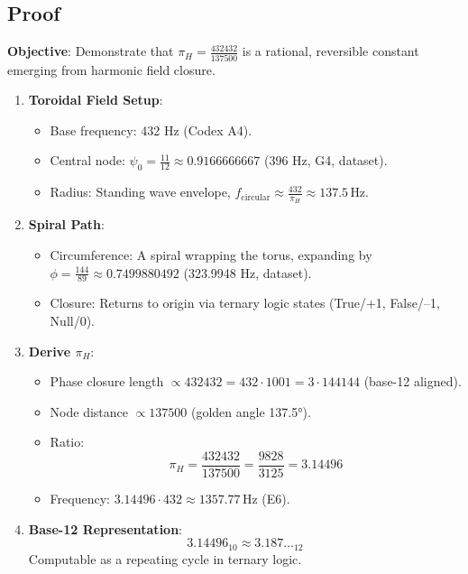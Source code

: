 \documentclass[a4paper,12pt]{article}
\begin{document}
\subsection{Proof}
\textbf{Objective}: Demonstrate that \(\pi_H = \frac{432432}{137500}\) is a rational, reversible constant emerging from harmonic field closure.

\begin{enumerate}
    \item \textbf{Toroidal Field Setup}:
    \begin{itemize}
        \item Base frequency: 432 Hz (Codex A4).
        \item Central node: \(\psi_0 = \frac{11}{12} \approx 0.9166666667\) (396 Hz, G4, dataset).
        \item Radius: Standing wave envelope, \( f_{\text{circular}} \approx \frac{432}{\pi_H} \approx 137.5 \, \text{Hz} \).
    \end{itemize}
    
    \item \textbf{Spiral Path}:
    \begin{itemize}
        \item Circumference: A spiral wrapping the torus, expanding by \(\phi = \frac{144}{89} \approx 0.7499880492\) (323.9948 Hz, dataset).
        \item Closure: Returns to origin via ternary logic states (True/+1, False/–1, Null/0).
    \end{itemize}
    
    \item \textbf{Derive \(\pi_H\)}:
    \begin{itemize}
        \item Phase closure length \(\propto 432432 = 432 \cdot 1001 = 3 \cdot 144144\) (base-12 aligned).
        \item Node distance \(\propto 137500\) (golden angle 137.5°).
        \item Ratio:
        \[
        \pi_H = \frac{432432}{137500} = \frac{9828}{3125} = 3.14496
        \]
        \item Frequency: \( 3.14496 \cdot 432 \approx 1357.77 \, \text{Hz} \) (E6).
    \end{itemize}
    
    \item \textbf{Base-12 Representation}:
    \[
    3.14496_{10} \approx 3.187\ldots_{12}
    \]
    Computable as a repeating cycle in ternary logic.
    

\end{enumerate}
\end{document}
